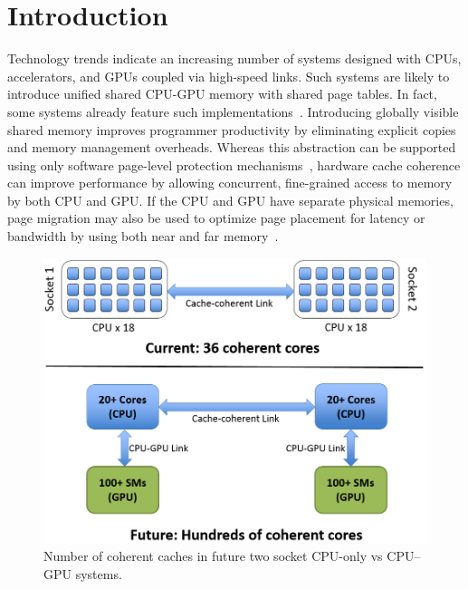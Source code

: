 \vspace{-.05in}
\section{Introduction}
\label{introduction}

Technology trends indicate an increasing number of systems designed with CPUs, 
accelerators, and GPUs coupled via high-speed 
links. Such systems are likely to introduce unified shared
CPU-GPU memory with shared page tables. In fact, some systems already
feature such implementations~\cite{AMDKaveri}.
Introducing globally visible shared memory
improves programmer productivity by eliminating explicit copies and memory 
management overheads. Whereas this abstraction can be supported using only
software page-level protection mechanisms~\cite{UVM, HSA}, hardware cache coherence 
can improve performance by allowing concurrent, fine-grained access to memory
by both CPU and GPU.  If the CPU and GPU have separate physical
memories, page migration may also be used to optimize page placement for
latency or bandwidth by using both near and far 
memory~\cite{Dashti2013,ref:agarwal:hpca2015,Meswani2015,Chou2015}.

\begin{figure}[t]
\centering
\includegraphics[width=1.0\columnwidth]{hpca2016/figures/coherent_cores.png}
\caption{Number of coherent caches in future two socket CPU-only vs CPU--GPU 
systems.}
\vspace{-0.175in}
\label{fig:motivation}
\end{figure}

